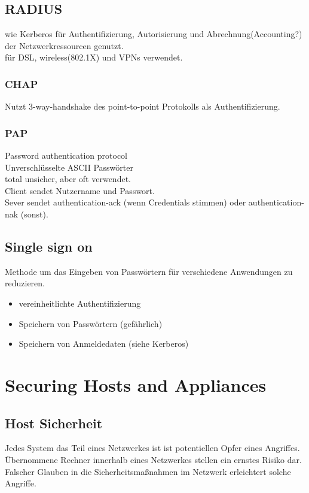 \documentclass{article} %
\begin{document}
\subsection{RADIUS}
wie Kerberos für Authentifizierung, Autorisierung und Abrechnung(Accounting?) der Netzwerkressourcen genutzt.\\
für DSL, wireless(802.1X) und VPNs verwendet.
\subsubsection{CHAP}
Nutzt 3-way-handshake des point-to-point Protokolls als Authentifizierung.
\subsubsection{PAP}
Password authentication protocol\\
Unverschlüsselte ASCII Passwörter\\
total unsicher, aber oft verwendet.\\
Client sendet Nutzername und Passwort.\\
Sever sendet authentication-ack (wenn Credentials stimmen) oder authentication-nak (sonst).
\subsection{Single sign on}
Methode um das Eingeben von Passwörtern für verschiedene Anwendungen zu reduzieren.
\begin{itemize}
	\item vereinheitlichte Authentifizierung
    \item Speichern von Passwörtern (gefährlich)
    \item Speichern von Anmeldedaten (siehe Kerberos)
\end{itemize}

\section{Securing Hosts and Appliances}
\subsection{Host Sicherheit}
Jedes System das Teil eines Netzwerkes ist ist potentiellen Opfer eines Angriffes.\\
Übernommene Rechner innerhalb eines Netzwerkes stellen ein ernstes Risiko dar.\\
Falscher Glauben in die Sicherheitsmaßnahmen im Netzwerk erleichtert solche Angriffe.
\end{document}
